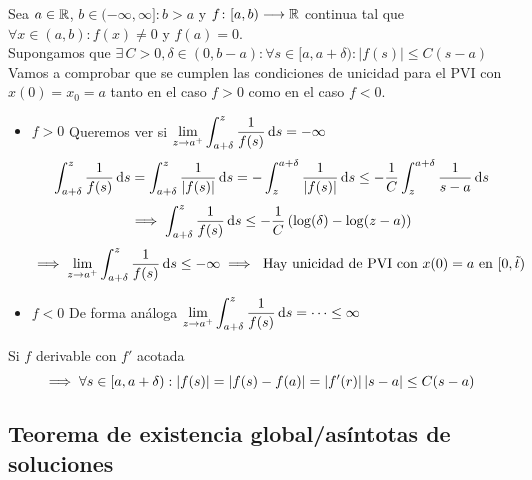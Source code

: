 \begin{obs}
	Sea $a\in \mathbb{R}$, $b \in (-\infty, \infty] : b>a$ y $f \colon [a,b) \longrightarrow \mathbb{R}$ continua tal que $\forall x \in (a,b) : f(x)\ne 0$ y $f(a)=0$. \\
	Supongamos que $\exists\, C >0, \delta \in (0, b-a) : \forall s \in [a, a+\delta) : |f(s)|\leq C(s -a)$ \\
	Vamos a comprobar que se cumplen las condiciones de unicidad para el PVI con $x(0)=x_0=a$ tanto en el caso $f>0$ como en el caso $f<0$.
	\begin{itemize}
		\item $\boxed{f>0}$ Queremos ver si $\ds \lim_{z\to a^+}\int_{a+\delta}^{z} \frac{1}{f(s)}\odif{s} = -\infty$
		      \[\int_{a+\delta}^{z} \frac{1}{f(s)}\odif{s} = \int_{a+\delta}^{z} \frac{1}{\abs{f(s)}}\odif{s}=-\int_{z}^{a+\delta} \frac{1}{\abs{f(s)}}\odif{s} \leq -\frac{1}{C} \int_{z}^{a+\delta} \frac{1}{s-a}\odif{s}\]
		      \[\implies \int_{a+\delta}^{z} \frac{1}{f(s)}\odif{s} \leq -\frac{1}{C}\left(\log(\delta)-\log(z-a)\right)\]
		      \[\implies \lim_{z\to a^+}\int_{a+\delta}^{z} \frac{1}{f(s)}\odif{s} \leq -\infty \implies \tex{ Hay unicidad de PVI con }x(0)=a \tex{ en } [0, \tilde{t})\]
		\item $\boxed{f<0}$ De forma análoga $\ds \lim_{z\to a^+}\int_{a+\delta}^{z} \frac{1}{f(s)}\odif{s} = \cdots \leq \infty$
	\end{itemize}
	Si $f$ derivable con $f'$ acotada
	\[\implies \forall s \in [a, a+\delta) : \left|f(s)\right|=\left|f(s)-f(a)\right|=\left|f'(r)\right|\left|s-a\right|\leq C(s-a)\]
\end{obs}


\subsection{Teorema de existencia global/asíntotas de soluciones}

